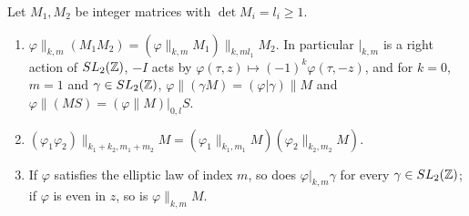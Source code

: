 \begin{lemma}\label{tr:lem:slash}
Let $M_1,M_2$ be integer matrices with $\det M_i=l_i\ge1$.
\begin{enumerate}
\item[(i)] $\varphi\|_{k,m}(M_1M_2)=(\varphi\|_{k,m}M_1)\|_{k,ml_1}M_2$. In particular $|_{k,m}$ is a right action of $SL_2(\mathbb{Z})$, $-I$ acts by $\varphi(\tau,z)\mapsto(-1)^k\varphi(\tau,-z)$, and for $k=0$, $m=1$ and $\gamma\in SL_2(\mathbb{Z})$, $\varphi\|(\gamma M)=(\varphi|\gamma)\|M$ and $\varphi\|(MS)=(\varphi\|M)|_{0,l}S$.
\item[(ii)] $(\varphi_1\varphi_2)\|_{k_1+k_2,m_1+m_2}M=(\varphi_1\|_{k_1,m_1}M)(\varphi_2\|_{k_2,m_2}M)$.
\item[(iii)] If $\varphi$ satisfies the elliptic law of index $m$, so does $\varphi|_{k,m}\gamma$ for every $\gamma\in SL_2(\mathbb{Z})$; if $\varphi$ is even in $z$, so is $\varphi\|_{k,m}M$.
\end{enumerate}
\end{lemma}

